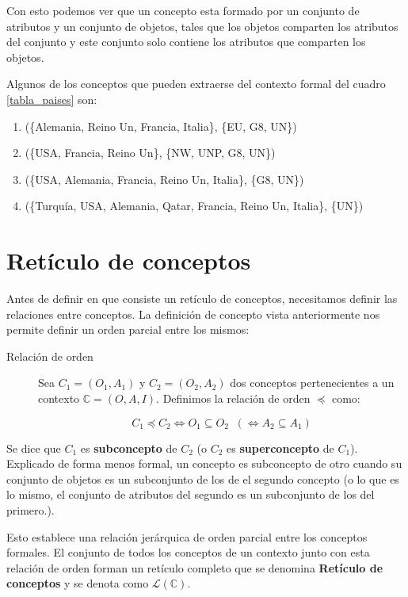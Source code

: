 	Con esto podemos ver que un concepto esta formado por un conjunto de atributos y un conjunto de objetos, tales que los objetos comparten los atributos del conjunto y este conjunto solo contiene los atributos que comparten los objetos.
	
	Algunos de los conceptos que pueden extraerse del contexto formal del cuadro \ref{tabla_paises} son:
	
	\begin{enumerate}
		\item (\{Alemania, Reino Un, Francia, Italia\}, \{EU, G8, UN\}) 
		\item (\{USA, Francia, Reino Un\}, \{NW, UNP, G8, UN\})
		\item (\{USA, Alemania, Francia, Reino Un, Italia\}, \{G8, UN\})

		\item (\{Turquía, USA, Alemania, Qatar, Francia, Reino Un, Italia\}, \{UN\})
	\end{enumerate}
	
	
\section*{Retículo de conceptos}	

	Antes de definir en que consiste un retículo de conceptos, necesitamos definir las relaciones entre conceptos. La definición de concepto vista anteriormente nos permite definir un orden parcial entre los mismos:
	
	\begin{description}
		\item[Relación de orden] Sea $C_1 = (O_1, A_1)$ y $ C_2 = (O_2, A_2)$ dos conceptos pertenecientes a un contexto $\mathbb{C} = (O,A,I)$. Definimos la relación de orden $ \preceq $ como:
		
		\[ C_1 \preceq C_2 \Longleftrightarrow O_1 \subseteq O_2 \;\; (\Leftrightarrow A_2 \subseteq A_1 ) \]
	\end{description} 

	Se dice que $C_1$ es \textbf{subconcepto} de $C_2$ (o $C_2$ es \textbf{superconcepto} de $C_1$). Explicado de forma menos formal, un concepto es subconcepto de otro cuando su conjunto de objetos es un subconjunto de los de el segundo concepto (o lo que es lo mismo, el conjunto de atributos del segundo es un subconjunto de los del primero.). 
	
	Esto establece una relación jerárquica de orden parcial entre los conceptos formales. El conjunto de todos los conceptos de un contexto junto con esta relación de orden forman un retículo completo que se denomina \textbf{Retículo de conceptos} y se denota como $\mathcal{L}(\mathbb{C})$.
	
